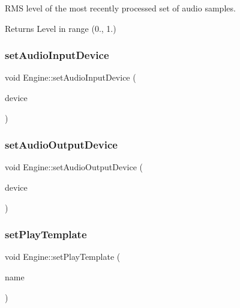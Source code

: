 R\+MS level of the most recently processed set of audio samples. \begin{DoxyReturn}{Returns}
Level in range (0., 1.) 
\end{DoxyReturn}
\hypertarget{class_engine_a14fc1862412916b29b6d885d6e4865bf}{}\label{class_engine_a14fc1862412916b29b6d885d6e4865bf} 
\subsubsection{\texorpdfstring{set\+Audio\+Input\+Device}{setAudioInputDevice}}
{\footnotesize\ttfamily void Engine\+::set\+Audio\+Input\+Device (\begin{DoxyParamCaption}\item[{const Q\+Audio\+Device\+Info \&}]{device }\end{DoxyParamCaption})\hspace{0.3cm}{\ttfamily [slot]}}

\hypertarget{class_engine_ae45195b977998e53441aed3006c9a35e}{}\label{class_engine_ae45195b977998e53441aed3006c9a35e} 
\subsubsection{\texorpdfstring{set\+Audio\+Output\+Device}{setAudioOutputDevice}}
{\footnotesize\ttfamily void Engine\+::set\+Audio\+Output\+Device (\begin{DoxyParamCaption}\item[{const Q\+Audio\+Device\+Info \&}]{device }\end{DoxyParamCaption})\hspace{0.3cm}{\ttfamily [slot]}}

\hypertarget{class_engine_a56fbf122df09a4f2c7d8ef053b355459}{}\label{class_engine_a56fbf122df09a4f2c7d8ef053b355459} 
\subsubsection{\texorpdfstring{set\+Play\+Template}{setPlayTemplate}}
{\footnotesize\ttfamily void Engine\+::set\+Play\+Template (\begin{DoxyParamCaption}\item[{Q\+String}]{name }\end{DoxyParamCaption})\hspace{0.3cm}{\ttfamily [slot]}}

